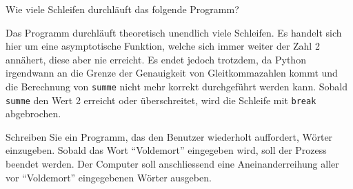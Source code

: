 \begin{mychallenge}
	Wie viele Schleifen durchläuft das folgende Programm?
	
	\begin{myanswer}
		Das Programm durchläuft theoretisch unendlich viele Schleifen. Es handelt sich hier um eine asymptotische Funktion, welche sich immer weiter der Zahl 2 annähert, diese aber nie erreicht. Es endet jedoch trotzdem, da Python irgendwann an die Grenze der Genauigkeit von Gleitkommazahlen kommt und die Berechnung von \lstinline|summe| nicht mehr korrekt durchgeführt werden kann. Sobald \lstinline|summe| den Wert 2 erreicht oder überschreitet, wird die Schleife mit \lstinline|break| abgebrochen.
	\end{myanswer}
\end{mychallenge}

\begin{myexercise}
	Schreiben Sie ein Programm, das den Benutzer wiederholt auffordert, Wörter einzugeben. Sobald das Wort \enquote{Voldemort} eingegeben wird, soll der Prozess beendet werden. Der Computer soll anschliessend eine Aneinanderreihung aller vor \enquote{Voldemort} eingegebenen Wörter ausgeben.
	\begin{myanswer}
		
	\end{myanswer}
\end{myexercise}

